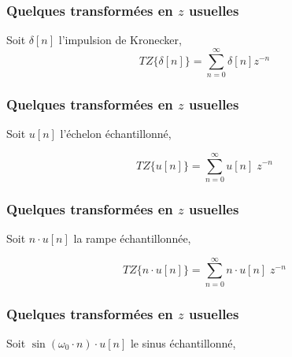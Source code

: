 \documentclass{beamer}
\begin{document}
\begin{frame} 
\frametitle{Quelques transformées en $z$ usuelles}
Soit $\delta [n]$ l'impulsion de Kronecker,
\vspace{0.3 cm}
\[TZ\{ \delta[n] \} = \sum_{n = 0}^{\infty} \delta[n] z^{-n}\]

\vspace{0.3 cm}

\vspace{0.3 cm}
\vspace{0.4cm}

\end{frame}

\begin{frame} 
\frametitle{Quelques transformées en $z$ usuelles}

Soit $u [n]$ l'échelon échantillonné,

\[TZ\{ u[n] \} = \sum_{n = 0}^{\infty} u[n] \; z^{-n}  \]

\vspace{0.3cm}
\end{frame} 

\begin{frame} 
\frametitle{Quelques transformées en $z$ usuelles}

Soit $n\cdot u [n]$ la rampe échantillonnée,

\[TZ\{ n\cdot u[n] \} = \sum_{n = 0}^{\infty} n \cdot u[n] \; z^{-n} \]

\vspace{0.3cm}


\end{frame}

\begin{frame} 
\frametitle{Quelques transformées en $z$ usuelles}

Soit $\sin(\omega_0 \cdot n )\cdot u [n]$ le sinus échantillonné,

\vspace{0.3cm}



\end{frame}
\end{document}

